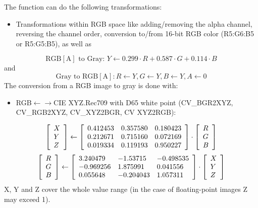 \documentclass{article}
\begin{document}
The function can do the following transformations:

\begin{itemize}
\item Transformations within RGB space like adding/removing the alpha channel, reversing the channel order, conversion to/from 16-bit RGB color (R5:G6:B5 or R5:G5:B5), as well as
\end{itemize}
\[
\mbox{RGB}\left[ \mbox{A} \right]\mbox{ to Gray: }Y\leftarrow 0.299\cdot
R+0.587\cdot G+0.114\cdot B
\]
and
\[
\mbox{Gray to RGB}\left[ \mbox{A} \right]:R\leftarrow Y,G\leftarrow
Y,B\leftarrow Y,A\leftarrow 0
\]
The conversion from a RGB image to gray is done with:

\begin{itemize}
\item RGB$\leftarrow \to $CIE XYZ.Rec709 with D65 white point (CV{\_}BGR2XYZ, CV{\_}RGB2XYZ, CV{\_}XYZ2BGR, CV XYZ2RGB):
\end{itemize}
\[
\left[ {{\begin{array}{*{20}c}
 X \hfill \\
 Y \hfill \\
 Z \hfill \\
\end{array} }} \right]\leftarrow \left[ {{\begin{array}{*{20}c}
 {0.412453} \hfill & {0.357580} \hfill & {0.180423} \hfill \\
 {0.212671} \hfill & {0.715160} \hfill & {0.072169} \hfill \\
 {0.019334} \hfill & {0.119193} \hfill & {0.950227} \hfill \\
\end{array} }} \right]\cdot \left[ {{\begin{array}{*{20}c}
 R \hfill \\
 G \hfill \\
 B \hfill \\
\end{array} }} \right]
\]
\[
\left[ {{\begin{array}{*{20}c}
 R \hfill \\
 G \hfill \\
 B \hfill \\
\end{array} }} \right]\leftarrow \left[ {{\begin{array}{*{20}c}
 {3.240479} \hfill & {-1.53715} \hfill & {-0.498535} \hfill \\
 {-0.969256} \hfill & {1.875991} \hfill & {0.041556} \hfill \\
 {0.055648} \hfill & {-0.204043} \hfill & {1.057311} \hfill \\
\end{array} }} \right]\cdot \left[ {{\begin{array}{*{20}c}
 X \hfill \\
 Y \hfill \\
 Z \hfill \\
\end{array} }} \right]
\]
X, Y and Z cover the whole value range (in the case of floating-point images
Z may exceed 1).
\end{document}
